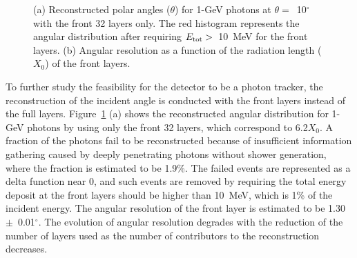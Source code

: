 \documentclass[12pt,times,draftclsnofoot,a4paper]{elsarticle}
\begin{document}
\begin{figure}[!hbt]
\centering
{}
\caption{ (a) Reconstructed polar angles ($\theta$) for 1-GeV photons at $\theta=$~10$^{\circ}$  with the front 32 layers only. The red histogram represents the angular distribution after requiring $E_{\rm{tot}}>$~10~MeV for the front layers. (b) Angular resolution as a function of the radiation length ($X_{0}$) of the front layers.}
\label{fig:angle_reco_layer}
\end{figure}

To further study the feasibility for the detector to be a photon tracker, the reconstruction of the incident angle is conducted with the front layers instead of the full layers. %
Figure~\ref{fig:angle_reco_layer} (a) shows the reconstructed angular distribution for 1-GeV photons by using only the front 32 layers, which correspond to 6.2$X_{0}$. A fraction of the photons fail to be reconstructed because of insufficient information gathering caused by deeply penetrating photons without shower generation, where the fraction is estimated to be 1.9\%. The failed events are represented as a delta function near 0, and such events are removed by requiring the total energy deposit at the front layers should be higher than 10~MeV, which is 1\% of the incident energy. The angular resolution of the front layer is estimated to be 1.30~$\pm$~0.01$^{\circ}$. The evolution of angular resolution degrades with the reduction of the number of layers used as the number of contributors to the reconstruction decreases.
\end{document}
